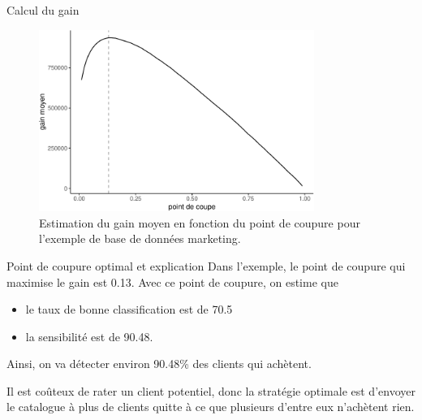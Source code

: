\documentclass[
  ignorenonframetext,
]{beamer}
\providecommand{\tightlist}{%
  \setlength{\itemsep}{0pt}\setlength{\parskip}{0pt}}\usepackage{longtable,booktabs,array}
\begin{document}
\begin{frame}{Calcul du gain}
\protect\hypertarget{calcul-du-gain}{}
\begin{figure}

{\centering \includegraphics[width=0.8\textwidth,height=\textheight]{MATH60602-diapos7_files/figure-beamer/fig-coupure-pondere-1.pdf}

}

\caption{\label{fig-coupure-pondere}Estimation du gain moyen en fonction
du point de coupure pour l'exemple de base de données marketing.}

\end{figure}
\end{frame}

\begin{frame}{Point de coupure optimal et explication}
\protect\hypertarget{point-de-coupure-optimal-et-explication}{}
Dans l'exemple, le point de coupure qui maximise le gain est 0.13. Avec
ce point de coupure, on estime que

\begin{itemize}
\tightlist
\item
  le taux de bonne classification est de 70.5
\item
  la sensibilité est de 90.48.
\end{itemize}

Ainsi, on va détecter environ 90.48\% des clients qui achètent.

Il est coûteux de rater un client potentiel, donc la stratégie optimale
est d'envoyer le catalogue à plus de clients quitte à ce que plusieurs
d'entre eux n'achètent rien.
\end{frame}
\end{document}
